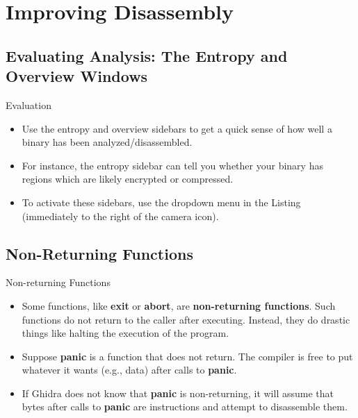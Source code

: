 \documentclass{beamer}
\begin{document}
\section{Improving Disassembly}

\subsection{Evaluating Analysis: The Entropy and Overview Windows}

\begin{frame}
\begin{block}{Evaluation}
\begin{itemize}
\item Use the entropy and overview sidebars to get a quick sense of how well a binary has been analyzed/disassembled.
\item For instance, the entropy sidebar can tell you whether your binary has regions which are likely encrypted or compressed.
\item To activate these sidebars, use the dropdown menu in the Listing (immediately to the right of the camera icon).
\end{itemize}
\end{block}
\end{frame}

\subsection{Non-Returning Functions}
\begin{frame}
\begin{block}{Non-returning Functions}
\begin{itemize}
\item Some functions, like \textbf{exit} or \textbf{abort}, are \textbf{non-returning functions}.  Such functions do not return to the caller after executing. Instead, they
do drastic things like halting the execution of the program.
\item Suppose \textbf{panic} is a function that does not return. The compiler is free to put whatever it wants (e.g., data) after calls to \textbf{panic}.
\item If Ghidra does not know that \textbf{panic} is non-returning, it will assume that bytes after calls to \textbf{panic} are instructions and attempt to disassemble them.
\end{itemize}
\end{block}
\end{frame}
\end{document}
